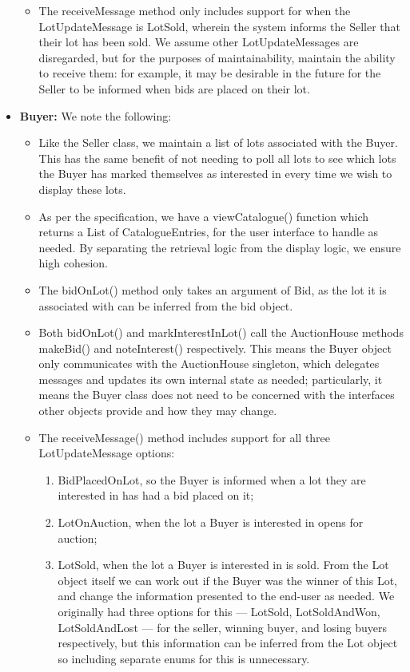 \documentclass[titlepage, 12pt]{extarticle}
\begin{document}
\begin{itemize}
\begin{itemize}
  \item The receiveMessage method only includes support for when the LotUpdateMessage is LotSold, wherein the system informs the Seller that their lot has been sold. We assume other LotUpdateMessages are disregarded, but for the purposes of maintainability, maintain the ability to receive them: for example, it may be desirable in the future for the Seller to be informed when bids are placed on their lot. 
  \end{itemize}
\item {\bf Buyer: } We note the following:
  \begin{itemize}
  \item Like the Seller class, we maintain a list of lots associated with the Buyer. This has the same benefit of not needing to poll all lots to see which lots the Buyer has marked themselves as interested in every time we wish to display these lots.
  \item As per the specification, we have a viewCatalogue() function which returns a List of CatalogueEntries, for the user interface to handle as needed. By separating the retrieval logic from the display logic, we ensure high cohesion. 
  \item The bidOnLot() method only takes an argument of Bid, as the lot it is associated with can be inferred from the bid object.
  \item Both bidOnLot() and markInterestInLot() call the AuctionHouse methods makeBid() and noteInterest() respectively. This means the Buyer object only communicates with the AuctionHouse singleton, which delegates messages and updates its own internal state as needed; particularly, it means the Buyer class does not need to be concerned with the interfaces other objects provide and how they may change. 
  \item The receiveMessage() method includes support for all three LotUpdateMessage options:
    \begin{enumerate}
      \item BidPlacedOnLot, so the Buyer is informed when a lot they are interested in has had a bid placed on it;
      \item LotOnAuction, when the lot a Buyer is interested in opens for auction;
      \item LotSold, when the lot a Buyer is interested in is sold. From the Lot object itself we can work out if the Buyer was the winner of this Lot, and change the information presented to the end-user as needed. We originally had three options for this --- LotSold, LotSoldAndWon, LotSoldAndLost --- for the seller, winning buyer, and losing buyers respectively, but this information can be inferred from the Lot object so including separate enums for this is unnecessary. 

\end{enumerate}
\end{itemize}
\end{itemize}
\end{document}
